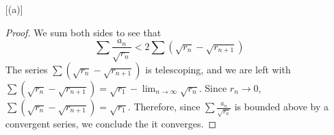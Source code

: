 \documentclass[11pt]{article}
\begin{document}
\begin{exercise}{12}
\begin{enumerate} [(a)]
\begin{proof}
            We sum both sides to see that $$\sum \frac{a_n}{\sqrt{r_n}} < 2 \sum (\sqrt{r_n} - \sqrt{r_{n+1}})$$ The series $\sum (\sqrt{r_n} - \sqrt{r_{n+1}})$ is telescoping, and we are left with $\sum (\sqrt{r_n} - \sqrt{r_{n+1}}) = \sqrt{r_1} - \lim_{n \to \infty} \sqrt{r_n}$. Since $r_n \to 0$, $\sum (\sqrt{r_n} - \sqrt{r_{n+1}}) = \sqrt{r_1}$. Therefore, since $\sum \frac{a_n}{\sqrt{r_n}}$ is bounded above by a convergent series, we conclude the it converges. 
        \end{proof}
    \end{enumerate}
\end{exercise}
\end{document}
